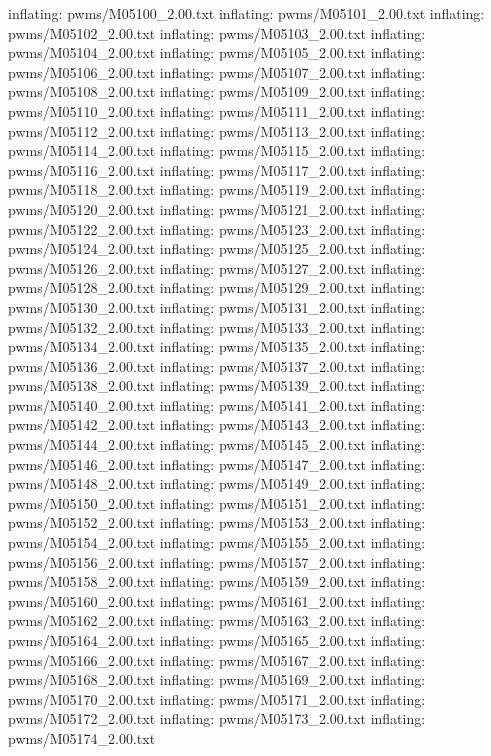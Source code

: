 \documentclass[letterpaper,10pt,english]{sphinxmanual}
\begin{document}
{\begin{sphinxVerbatim}[commandchars=\\\{\}]
  inflating: pwms/M05100\_2.00.txt
  inflating: pwms/M05101\_2.00.txt
  inflating: pwms/M05102\_2.00.txt
  inflating: pwms/M05103\_2.00.txt
  inflating: pwms/M05104\_2.00.txt
  inflating: pwms/M05105\_2.00.txt
  inflating: pwms/M05106\_2.00.txt
  inflating: pwms/M05107\_2.00.txt
  inflating: pwms/M05108\_2.00.txt
  inflating: pwms/M05109\_2.00.txt
  inflating: pwms/M05110\_2.00.txt
  inflating: pwms/M05111\_2.00.txt
  inflating: pwms/M05112\_2.00.txt
  inflating: pwms/M05113\_2.00.txt
  inflating: pwms/M05114\_2.00.txt
  inflating: pwms/M05115\_2.00.txt
  inflating: pwms/M05116\_2.00.txt
  inflating: pwms/M05117\_2.00.txt
  inflating: pwms/M05118\_2.00.txt
  inflating: pwms/M05119\_2.00.txt
  inflating: pwms/M05120\_2.00.txt
  inflating: pwms/M05121\_2.00.txt
  inflating: pwms/M05122\_2.00.txt
  inflating: pwms/M05123\_2.00.txt
  inflating: pwms/M05124\_2.00.txt
  inflating: pwms/M05125\_2.00.txt
  inflating: pwms/M05126\_2.00.txt
  inflating: pwms/M05127\_2.00.txt
  inflating: pwms/M05128\_2.00.txt
  inflating: pwms/M05129\_2.00.txt
  inflating: pwms/M05130\_2.00.txt
  inflating: pwms/M05131\_2.00.txt
  inflating: pwms/M05132\_2.00.txt
  inflating: pwms/M05133\_2.00.txt
  inflating: pwms/M05134\_2.00.txt
  inflating: pwms/M05135\_2.00.txt
  inflating: pwms/M05136\_2.00.txt
  inflating: pwms/M05137\_2.00.txt
  inflating: pwms/M05138\_2.00.txt
  inflating: pwms/M05139\_2.00.txt
  inflating: pwms/M05140\_2.00.txt
  inflating: pwms/M05141\_2.00.txt
  inflating: pwms/M05142\_2.00.txt
  inflating: pwms/M05143\_2.00.txt
  inflating: pwms/M05144\_2.00.txt
  inflating: pwms/M05145\_2.00.txt
  inflating: pwms/M05146\_2.00.txt
  inflating: pwms/M05147\_2.00.txt
  inflating: pwms/M05148\_2.00.txt
  inflating: pwms/M05149\_2.00.txt
  inflating: pwms/M05150\_2.00.txt
  inflating: pwms/M05151\_2.00.txt
  inflating: pwms/M05152\_2.00.txt
  inflating: pwms/M05153\_2.00.txt
  inflating: pwms/M05154\_2.00.txt
  inflating: pwms/M05155\_2.00.txt
  inflating: pwms/M05156\_2.00.txt
  inflating: pwms/M05157\_2.00.txt
  inflating: pwms/M05158\_2.00.txt
  inflating: pwms/M05159\_2.00.txt
  inflating: pwms/M05160\_2.00.txt
  inflating: pwms/M05161\_2.00.txt
  inflating: pwms/M05162\_2.00.txt
  inflating: pwms/M05163\_2.00.txt
  inflating: pwms/M05164\_2.00.txt
  inflating: pwms/M05165\_2.00.txt
  inflating: pwms/M05166\_2.00.txt
  inflating: pwms/M05167\_2.00.txt
  inflating: pwms/M05168\_2.00.txt
  inflating: pwms/M05169\_2.00.txt
  inflating: pwms/M05170\_2.00.txt
  inflating: pwms/M05171\_2.00.txt
  inflating: pwms/M05172\_2.00.txt
  inflating: pwms/M05173\_2.00.txt
  inflating: pwms/M05174\_2.00.txt

\end{sphinxVerbatim}}
\end{document}
